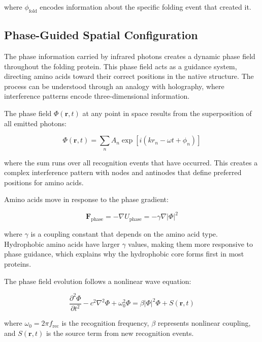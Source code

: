 \documentclass[12pt,a4paper]{report}
\begin{document}
where $\phi_{\text{fold}}$ encodes information about the specific folding event that created it.

\subsection{Phase-Guided Spatial Configuration}

The phase information carried by infrared photons creates a dynamic phase field throughout the folding protein. This phase field acts as a guidance system, directing amino acids toward their correct positions in the native structure. The process can be understood through an analogy with holography, where interference patterns encode three-dimensional information.

The phase field $\Phi(\mathbf{r}, t)$ at any point in space results from the superposition of all emitted photons:

\begin{equation}
\Phi(\mathbf{r}, t) = \sum_n A_n \exp\left[i\left(k r_n - \omega t + \phi_n\right)\right]
\end{equation}

where the sum runs over all recognition events that have occurred. This creates a complex interference pattern with nodes and antinodes that define preferred positions for amino acids.

Amino acids move in response to the phase gradient:

\begin{equation}
\mathbf{F}_{\text{phase}} = -\nabla U_{\text{phase}} = -\gamma \nabla|\Phi|^2
\end{equation}

where $\gamma$ is a coupling constant that depends on the amino acid type. Hydrophobic amino acids have larger $\gamma$ values, making them more responsive to phase guidance, which explains why the hydrophobic core forms first in most proteins.

The phase field evolution follows a nonlinear wave equation:

\begin{equation}
\frac{\partial^2 \Phi}{\partial t^2} - c^2 \nabla^2 \Phi + \omega_0^2 \Phi = \beta |\Phi|^2 \Phi + S(\mathbf{r}, t)
\end{equation}

where $\omega_0 = 2\pi f_{\text{rec}}$ is the recognition frequency, $\beta$ represents nonlinear coupling, and $S(\mathbf{r}, t)$ is the source term from new recognition events.
\end{document}
